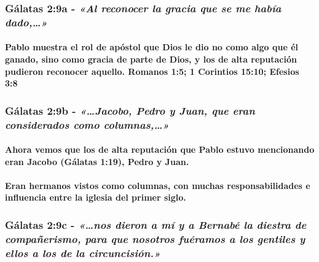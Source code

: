 \documentclass[11a pt,twoside]{article}
\newcommand{\scripture}[1]{%
  {\fontsize{12pt}{16pt}\selectfont\ScriptureFont\itshape #1}%
}
\let\oldsubsubsection\subsubsection
\renewcommand{\subsubsection}{\needspace{4\baselineskip}\oldsubsubsection}
\let\oldparagraph\paragraph
\renewcommand{\paragraph}{\needspace{3\baselineskip}\oldparagraph}
\begin{document}
\subsubsection{\texorpdfstring{Gálatas 2:9a -
\scripture{«Al reconocer la gracia que se me había dado,…»}}{Gálatas 2:9a - }}\label{guxe1latas-29a---al-reconocer-la-gracia-que-se-me-habuxeda-dado}

\paragraph{Pablo muestra el rol de apóstol que Dios le dio no como algo
que él ganado, sino como gracia de parte de Dios, y los de alta
reputación pudieron reconocer aquello. Romanos 1:5; 1 Corintios 15:10;
Efesios
3:8}\label{pablo-muestra-el-rol-de-apuxf3stol-que-dios-le-dio-no-como-algo-que-uxe9l-ganado-sino-como-gracia-de-parte-de-dios-y-los-de-alta-reputaciuxf3n-pudieron-reconocer-aquello.-romanos-15-1-corintios-1510-efesios-38}

\subsubsection{\texorpdfstring{Gálatas 2:9b -
\scripture{«…Jacobo, Pedro y Juan, que eran considerados como columnas,…»}}{Gálatas 2:9b - }}\label{guxe1latas-29b---jacobo-pedro-y-juan-que-eran-considerados-como-columnas}

\paragraph{Ahora vemos que los de alta reputación que Pablo estuvo
mencionando eran Jacobo (Gálatas 1:19), Pedro y
Juan.}\label{ahora-vemos-que-los-de-alta-reputaciuxf3n-que-pablo-estuvo-mencionando-eran-jacobo-guxe1latas-119-pedro-y-juan.}

\paragraph{Eran hermanos vistos como columnas, con muchas
responsabilidades e influencia entre la iglesia del primer
siglo.}\label{eran-hermanos-vistos-como-columnas-con-muchas-responsabilidades-e-influencia-entre-la-iglesia-del-primer-siglo.}

\subsubsection{\texorpdfstring{Gálatas 2:9c -
\scripture{«…nos dieron a mí y a Bernabé la diestra de compañerismo, para que nosotros fuéramos a los gentiles y ellos a los de la circuncisión.»}}{Gálatas 2:9c - }}\label{guxe1latas-29c---nos-dieron-a-muxed-y-a-bernabuxe9-la-diestra-de-compauxf1erismo-para-que-nosotros-fuuxe9ramos-a-los-gentiles-y-ellos-a-los-de-la-circuncisiuxf3n.}
\end{document}
